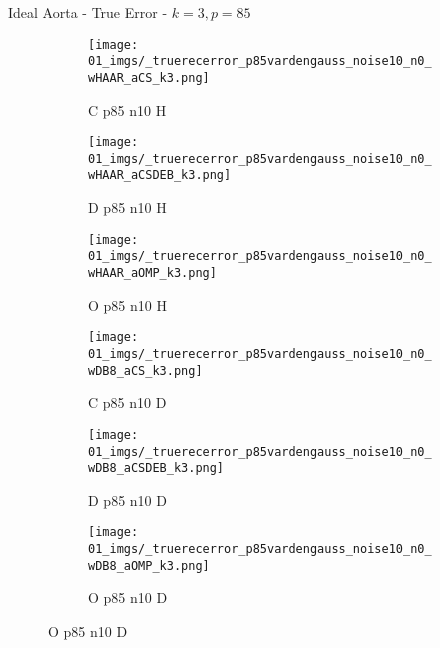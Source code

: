\begin{frame}{Ideal Aorta - True Error - $k=3,p=85$}{}
\begin{figure}
\begin{subfigure}{0.13\textwidth}
\texttt{[image: 01\_imgs/\_truerecerror\_p85vardengauss\_noise10\_n0\_wHAAR\_aCS\_k3.png]}
\caption*{\tiny C p85 n10 H}
\end{subfigure}
\begin{subfigure}{0.13\textwidth}
\texttt{[image: 01\_imgs/\_truerecerror\_p85vardengauss\_noise10\_n0\_wHAAR\_aCSDEB\_k3.png]}
\caption*{\tiny D p85 n10 H}
\end{subfigure}
\begin{subfigure}{0.13\textwidth}
\texttt{[image: 01\_imgs/\_truerecerror\_p85vardengauss\_noise10\_n0\_wHAAR\_aOMP\_k3.png]}
\caption*{\tiny O p85 n10 H}
\end{subfigure}
\begin{subfigure}{0.13\textwidth}
\texttt{[image: 01\_imgs/\_truerecerror\_p85vardengauss\_noise10\_n0\_wDB8\_aCS\_k3.png]}
\caption*{\tiny C p85 n10 D}
\end{subfigure}
\begin{subfigure}{0.13\textwidth}
\texttt{[image: 01\_imgs/\_truerecerror\_p85vardengauss\_noise10\_n0\_wDB8\_aCSDEB\_k3.png]}
\caption*{\tiny D p85 n10 D}
\end{subfigure}
\begin{subfigure}{0.13\textwidth}
\texttt{[image: 01\_imgs/\_truerecerror\_p85vardengauss\_noise10\_n0\_wDB8\_aOMP\_k3.png]}
\caption*{\tiny O p85 n10 D}
\end{subfigure}

\vspace{5pt}


\end{figure}
\end{frame}
